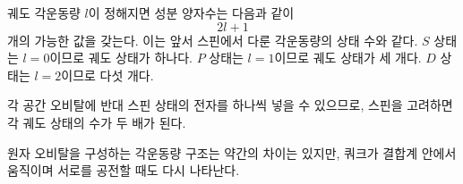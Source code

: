 궤도 각운동량 \(l\)이 정해지면 성분 양자수는 다음과 같이
\begin{equation}
2l+1
\end{equation}
개의 가능한 값을 갖는다. 이는 앞서 스핀에서 다룬 각운동량의 상태 수와 같다. \(S\) 상태는 \(l=0\)이므로 궤도 상태가 하나다. \(P\) 상태는 \(l=1\)이므로 궤도 상태가 세 개다. \(D\) 상태는 \(l=2\)이므로 다섯 개다.

각 공간 오비탈에 반대 스핀 상태의 전자를 하나씩 넣을 수 있으므로, 스핀을 고려하면 각 궤도 상태의 수가 두 배가 된다.

\begin{classroomqa}
\end{classroomqa}

원자 오비탈을 구성하는 각운동량 구조는 약간의 차이는 있지만, 쿼크가 결합계 안에서 움직이며 서로를 공전할 때도 다시 나타난다.
